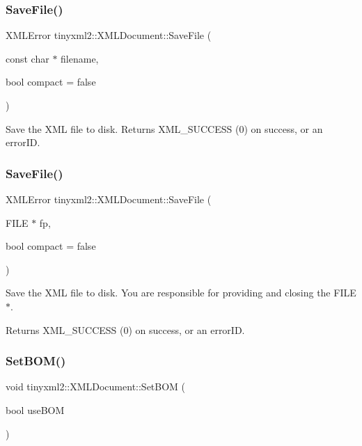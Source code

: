 \subsubsection{\texorpdfstring{SaveFile()}{SaveFile()}\hspace{0.1cm}{\footnotesize\ttfamily [1/2]}}
{\footnotesize\ttfamily X\+M\+L\+Error tinyxml2\+::\+X\+M\+L\+Document\+::\+Save\+File (\begin{DoxyParamCaption}\item[{const char $\ast$}]{filename,  }\item[{bool}]{compact = {\ttfamily false} }\end{DoxyParamCaption})}

Save the X\+ML file to disk. Returns X\+M\+L\+\_\+\+S\+U\+C\+C\+E\+SS (0) on success, or an error\+ID. \mbox{\label{classtinyxml2_1_1_x_m_l_document_a8b95779479a0035acc67b3a61dfe1b74}} 
\subsubsection{\texorpdfstring{SaveFile()}{SaveFile()}\hspace{0.1cm}{\footnotesize\ttfamily [2/2]}}
{\footnotesize\ttfamily X\+M\+L\+Error tinyxml2\+::\+X\+M\+L\+Document\+::\+Save\+File (\begin{DoxyParamCaption}\item[{F\+I\+LE $\ast$}]{fp,  }\item[{bool}]{compact = {\ttfamily false} }\end{DoxyParamCaption})}

Save the X\+ML file to disk. You are responsible for providing and closing the F\+I\+L\+E$\ast$.

Returns X\+M\+L\+\_\+\+S\+U\+C\+C\+E\+SS (0) on success, or an error\+ID. \mbox{\label{classtinyxml2_1_1_x_m_l_document_a14419b698f7c4b140df4e80f3f0c93b0}} 
\subsubsection{\texorpdfstring{SetBOM()}{SetBOM()}}
{\footnotesize\ttfamily void tinyxml2\+::\+X\+M\+L\+Document\+::\+Set\+B\+OM (\begin{DoxyParamCaption}\item[{bool}]{use\+B\+OM }\end{DoxyParamCaption})\hspace{0.3cm}{\ttfamily [inline]}}


